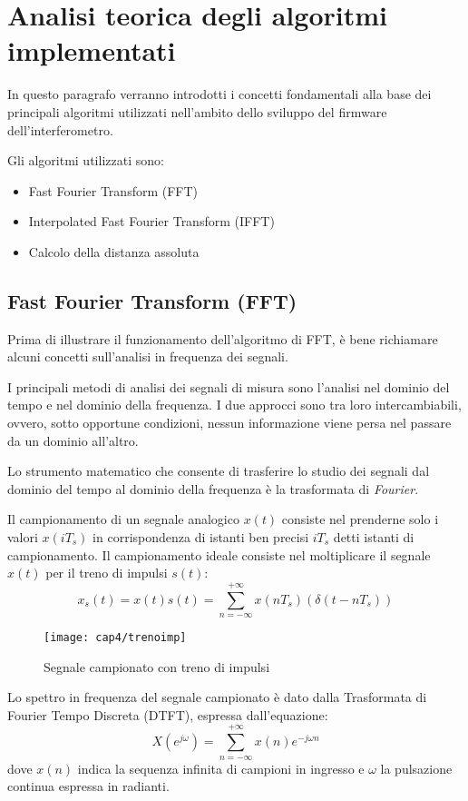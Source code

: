 \section{Analisi teorica degli algoritmi implementati}
In questo paragrafo verranno introdotti i concetti fondamentali alla base dei principali algoritmi utilizzati nell'ambito dello sviluppo del firmware dell'interferometro.

Gli algoritmi utilizzati sono:
\begin{itemize}
	\item Fast Fourier Transform (FFT)
	\item Interpolated Fast Fourier Transform (IFFT)
	\item Calcolo della distanza assoluta
\end{itemize}

\subsection{Fast Fourier Transform (FFT)}
Prima di illustrare il funzionamento dell'algoritmo di FFT, è bene richiamare alcuni concetti sull'analisi in frequenza dei segnali.

I principali metodi di analisi dei segnali di misura sono l'analisi nel dominio del tempo e nel dominio della frequenza. I due approcci sono tra loro intercambiabili, ovvero, sotto opportune condizioni, nessun informazione viene persa nel passare da un dominio all'altro. 

Lo strumento matematico che consente di trasferire lo studio dei segnali dal dominio del tempo al dominio della frequenza è la trasformata di \textit{Fourier}.

Il campionamento di un segnale analogico $x(t)$ consiste nel prenderne solo i valori $x(iT_s)$ in corrispondenza di istanti ben precisi $iT_s$ detti istanti di campionamento. 
Il campionamento ideale consiste nel moltiplicare il segnale $x(t)$ per il treno di impulsi $s(t)$:
\begin{equation}
	x_s(t)=x(t) s(t) = \sum_{n=-\infty}^{+\infty} x(nT_s) (\delta (t-nT_s))
\end{equation}
\begin{figure}  
  \begin{center}
    \texttt{[image: cap4/trenoimp]}
    \caption{Segnale campionato con treno di impulsi}
  \end{center}
\end{figure}

Lo spettro in frequenza del segnale campionato è dato dalla Trasformata di Fourier Tempo Discreta (DTFT), espressa dall'equazione: 
\begin{equation}
	X(e^{j\omega}) = \sum_{n=-\infty}^{+\infty} x(n)e^{-j\omega n}
\end{equation}
dove $x(n)$ indica la sequenza infinita di campioni in ingresso e $\omega$ la pulsazione continua espressa in radianti.

